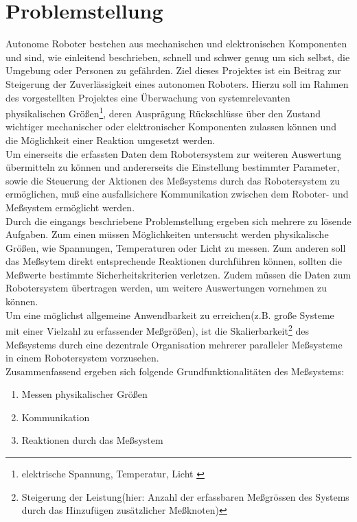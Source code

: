 \documentclass[
	11pt,								%
	a4paper,						%
	oneside,						%
	titlepage,					%
	headsepline,				%
	DIV13,							%
	abstracton,	 				%
	BCOR0cm,						%
	bibliography=totoc, %
]{scrreprt}							%
\begin{document}
\chapter{Problemstellung}
\label{cha:Problemstellung}
Autonome Roboter bestehen aus mechanischen und elektronischen Komponenten und sind, wie einleitend beschrieben, 
schnell und schwer genug um sich selbst, die Umgebung oder Personen zu gefährden. 
Ziel dieses Projektes ist ein Beitrag zur Steigerung der Zuverlässigkeit eines autonomen Roboters. Hierzu soll im Rahmen des vorgestellten
Projektes eine Überwachung von systemrelevanten physikalischen Größen\footnote{elektrische Spannung, Temperatur, Licht \cite{5}},
deren Ausprägung Rückschlüsse über den Zustand wichtiger mechanischer oder elektronischer Komponenten zulassen können und die Möglichkeit einer Reaktion umgesetzt werden.\\
Um einerseits die erfassten Daten dem Robotersystem zur weiteren Auswertung übermitteln zu können und andererseits die Einstellung bestimmter Parameter, 
sowie die Steuerung der Aktionen des Meßsystems durch das Robotersystem zu ermöglichen, muß eine ausfallsichere Kommunikation zwischen dem Roboter- und Meßsystem
ermöglicht werden.\\
Durch die eingangs beschriebene Problemstellung ergeben sich mehrere zu lösende Aufgaben.
Zum einen müssen Möglichkeiten untersucht werden physikalische Größen, wie Spannungen, Temperaturen oder Licht zu messen.
Zum anderen soll das Meßsytem direkt entsprechende Reaktionen durchführen können, sollten die Meßwerte bestimmte Sicherheitskriterien verletzen. 
Zudem müssen die Daten zum Robotersystem übertragen werden, um weitere Auswertungen vornehmen zu können.\\
Um eine möglichst allgemeine Anwendbarkeit zu erreichen(z.B. große Systeme mit einer Vielzahl zu erfassender Meßgrößen), ist die Skalierbarkeit\footnote{Steigerung der Leistung(hier: Anzahl der erfassbaren Meßgrössen des Systems durch das Hinzufügen zusätzlicher Meßknoten)\cite{6}}
des Meßsystems durch eine dezentrale Organisation mehrerer paralleler Meßsysteme in einem Robotersystem vorzusehen.\\

Zusammenfassend ergeben sich folgende Grundfunktionalitäten des Meßsystems:
\begin{enumerate}
 \item Messen physikalischer Größen
 \item Kommunikation 
 \item Reaktionen durch das Meßsystem
\end{enumerate}
\end{document}
